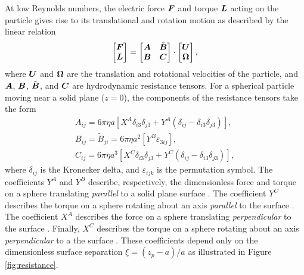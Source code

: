 \begin{appendices}
At low Reynolds numbers, the electric force $\boldsymbol{F}$ and torque $\boldsymbol{L}$ acting on the particle gives rise to its translational and rotation motion as described by the linear relation
\begin{equation}
    \begin{bmatrix}
    \boldsymbol{F} \\ \boldsymbol{L}
    \end{bmatrix}
    =
    \begin{bmatrix}
    \boldsymbol{A} & \tilde{\boldsymbol{B}}
    \\ 
    \boldsymbol{B} & \boldsymbol{C}
    \end{bmatrix}
    \cdot
    \begin{bmatrix}
    \boldsymbol{U} \\ \boldsymbol{\Omega}
    \end{bmatrix}, \label{eq:resistance}
\end{equation}
where $\boldsymbol{U}$ and $\boldsymbol{\Omega}$ are the translation and rotational velocities of the particle, and  $\boldsymbol{A}$, $\boldsymbol{B}$, $\tilde{\boldsymbol{B}}$, and $\boldsymbol{C}$ are hydrodynamic resistance tensors.  For a spherical particle moving near a solid plane ($z=0$), the components of the resistance tensors take the form 
\begin{gather}
    A_{ij} = 6\pi\eta a \left[ X^A \delta_{i3}\delta_{j3} + Y^A (\delta_{ij} - \delta_{i3}\delta_{j3}) \right], 
    \\
    B_{ij} = \tilde{B}_{ji} = 6\pi\eta a^2 \left[ Y^B \varepsilon_{3ij} \right],
    \\
    C_{ij} = 6\pi\eta a^3 \left[  X^C \delta_{i3}\delta_{j3} + Y^C (\delta_{ij} - \delta_{i3}\delta_{j3}) \right], 
\end{gather}
where $\delta_{ij}$ is the Kronecker delta, and $\varepsilon_{ijk}$ is the permutation symbol. The coefficients $Y^A$ and $Y^B$ describe, respectively, the dimensionless force and torque on a sphere translating \emph{parallel} to a solid plane surface \cite{ONeill1964a}. The coefficient $Y^C$ describes the torque on a sphere rotating about an axis \emph{parallel} to the surface \cite{Dean1963}. The coefficient $X^A$ describes the force on a sphere translating \emph{perpendicular} to the surface \cite{Brenner1961a}.  Finally, $X^C$ describes the torque on a sphere rotating about an axis \emph{perpendicular} to a the surface \cite{Jeffrey1915}. These coefficients depend only on the dimensionless surface separation $\xi = (z_p - a)/a$ as illustrated in Figure \ref{fig:resistance}. 


\end{appendices}
